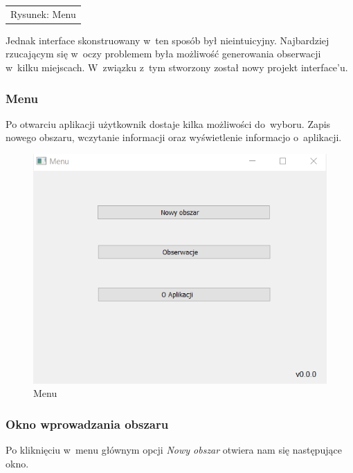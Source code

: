 \documentclass{article}
\begin{document}
\begin{center}
\begin{tabular}{c}
\\Rysunek: Menu
\end{tabular}
\end{center}
\newpage

Jednak interface skonstruowany w~ten sposób  był nieintuicyjny. Najbardziej rzucającym się w~oczy problemem była możliwość generowania obserwacji w~kilku miejscach. W~związku z~tym stworzony został nowy projekt interface'u.
\subsubsection{Menu}
 Po otwarciu aplikacji użytkownik dostaje kilka możliwości do~wyboru. Zapis nowego obszaru, wczytanie informacji oraz wyświetlenie informacjo o~aplikacji.
  \begin{figure}[h] 
\begin{center}
\includegraphics[scale = 1]{"menu.png"}
\end{center}
\caption{Menu}
\label{}
\end{figure}
 \newpage
\subsubsection{Okno wprowadzania obszaru}
 Po kliknięciu w~menu głównym opcji \textit{Nowy obszar} otwiera nam się następujące okno.
 
\end{document}
